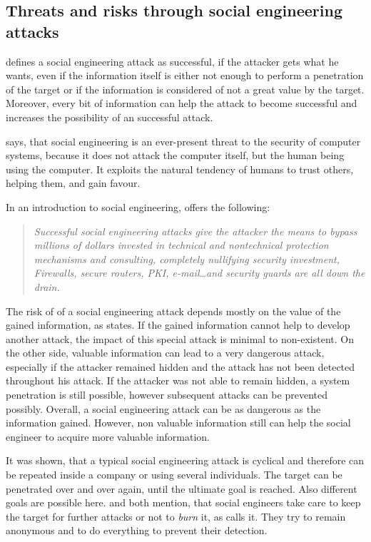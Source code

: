 \subsection{Threats and risks through social engineering attacks}

\cite{thornburgh2004} defines a social engineering attack as successful, if the
attacker gets what he wants, even if the information itself is either not
enough to perform a penetration of the target or if the information is
considered of not a great value by the target. Moreover, every bit of
information can help the attack to become successful and increases the
possibility of an successful attack.

\cite{orgill2004} says, that social engineering is an ever-present threat to
the security of computer systems, because it does not attack the computer
itself, but the human being using the computer. It exploits the natural
tendency of humans to trust others, helping them, and gain favour.

In an introduction to social engineering, \cite{manske2000} offers the following:

\begin{quote}\textit{
Successful social engineering attacks give the attacker the means to bypass
millions of dollars invested in technical and nontechnical protection
mechanisms and consulting, completely nullifying security investment,
Firewalls, secure routers, PKI, e-mail\dots and security guards are all down
the drain. 
} \end{quote}

The risk of of a social engineering attack depends mostly on the value of the
gained information, as \cite{thornburgh2004} states. If the gained information
cannot help to develop another attack, the impact of this special attack is
minimal to non-existent. On the other side, valuable information can lead to a
very dangerous attack, especially if the attacker remained hidden and the
attack has not been detected throughout his attack. If the attacker was not
able to remain hidden, a system penetration is still possible, however
subsequent attacks can be prevented possibly. Overall, a social engineering
attack can be as dangerous as the information gained. However, non valuable
information still can help the social engineer to acquire more valuable
information.

It was shown, that a typical social engineering attack is cyclical and
therefore can be repeated inside a company or using several individuals. The
target can be penetrated over and over again, until the ultimate goal is
reached. Also different goals are possible here. \cite{thornburgh2004} and
\cite{mitnick2003} both mention, that social engineers take care to keep the
target for further attacks or not to \textit{burn} it, as \cite{thornburgh2004}
calls it. They try to remain anonymous and to do everything to prevent their
detection.

